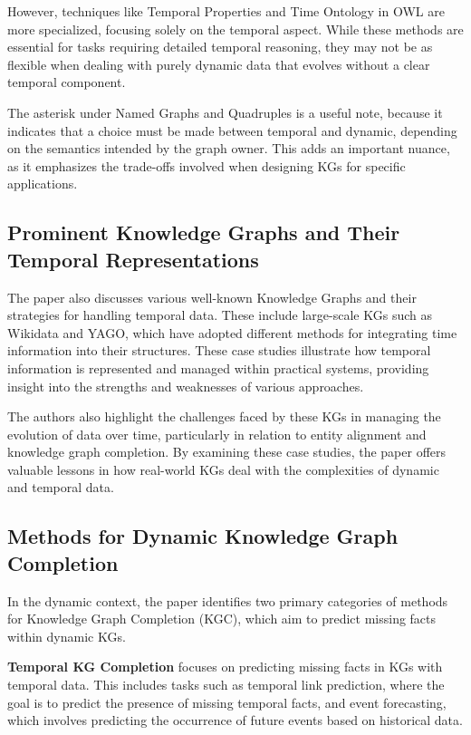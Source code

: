 However, techniques like Temporal Properties and Time Ontology in OWL are more specialized, focusing solely on the temporal aspect. While these methods are essential for tasks 
requiring detailed temporal reasoning, they may not be as flexible when dealing with purely dynamic data that evolves without a clear temporal component.

The asterisk under Named Graphs and Quadruples is a useful note, because it indicates that a choice must be made between temporal and dynamic, depending on the semantics intended 
by the graph owner. This adds an important nuance, as it emphasizes the trade-offs involved when designing KGs for specific applications.

\subsection{Prominent Knowledge Graphs and Their Temporal Representations}

The paper also discusses various well-known Knowledge Graphs and their strategies for handling temporal data. These include large-scale KGs such as Wikidata and YAGO, which have 
adopted different methods for integrating time information into their structures. These case studies illustrate how temporal information is represented and managed within practical 
systems, providing insight into the strengths and weaknesses of various approaches.

The authors also highlight the challenges faced by these KGs in managing the evolution of data over time, particularly in relation to entity alignment and knowledge graph completion. 
By examining these case studies, the paper offers valuable lessons in how real-world KGs deal with the complexities of dynamic and temporal data.

\subsection{Methods for Dynamic Knowledge Graph Completion}

In the dynamic context, the paper identifies two primary categories of methods for Knowledge Graph Completion (KGC), which aim to predict missing facts within dynamic KGs.

\textbf{Temporal KG Completion} focuses on predicting missing facts in KGs with temporal data. This includes tasks such as temporal link prediction, where the goal is to predict the 
presence of missing temporal facts, and event forecasting, which involves predicting the occurrence of future events based on historical data.

